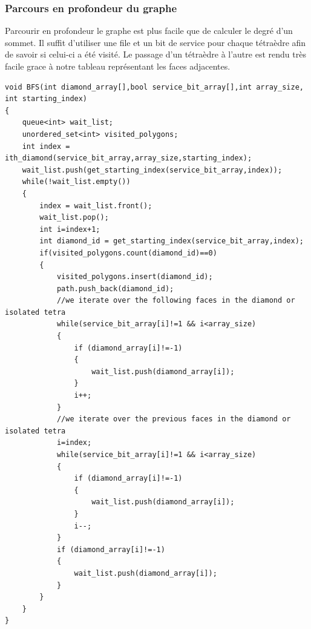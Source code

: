 \documentclass[a4paper,11pt,openany]{article}
\begin{document}
\subsubsection{Parcours en profondeur du graphe}
\noindent
Parcourir en profondeur le graphe est plus facile que de calculer le degré d'un sommet. Il suffit d'utiliser une file et un bit de service pour chaque tétraèdre afin de savoir si celui-ci a été visité. Le passage d'un tétraèdre à l'autre est rendu très facile grace à notre tableau représentant les faces adjacentes.
\begin{lstlisting}
void BFS(int diamond_array[],bool service_bit_array[],int array_size,
int starting_index)
{
    queue<int> wait_list;
    unordered_set<int> visited_polygons; 
    int index = ith_diamond(service_bit_array,array_size,starting_index);    
    wait_list.push(get_starting_index(service_bit_array,index)); 
    while(!wait_list.empty())
    {
        index = wait_list.front();
        wait_list.pop();
        int i=index+1;
        int diamond_id = get_starting_index(service_bit_array,index);
        if(visited_polygons.count(diamond_id)==0)
        {
            visited_polygons.insert(diamond_id);
            path.push_back(diamond_id);
            //we iterate over the following faces in the diamond or isolated tetra
            while(service_bit_array[i]!=1 && i<array_size)
            {
                if (diamond_array[i]!=-1)
                {
                    wait_list.push(diamond_array[i]);
                }
                i++;               
            }
            //we iterate over the previous faces in the diamond or isolated tetra
            i=index;
            while(service_bit_array[i]!=1 && i<array_size)
            {
                if (diamond_array[i]!=-1)
                {
                    wait_list.push(diamond_array[i]);
                }
                i--;
            }
            if (diamond_array[i]!=-1)
            {
                wait_list.push(diamond_array[i]);
            }
        }
    }
}

\end{lstlisting}
\end{document}
